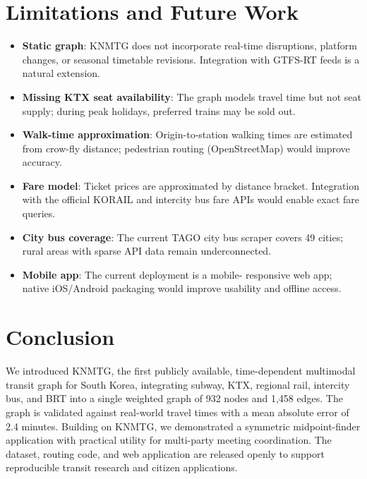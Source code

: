 \documentclass[12pt]{article}
\begin{document}
\section{Limitations and Future Work}

\begin{itemize}
  \item \textbf{Static graph}: KNMTG does not incorporate real-time
    disruptions, platform changes, or seasonal timetable revisions.
    Integration with GTFS-RT feeds is a natural extension.
  \item \textbf{Missing KTX seat availability}: The graph models travel
    time but not seat supply; during peak holidays, preferred trains
    may be sold out.
  \item \textbf{Walk-time approximation}: Origin-to-station walking
    times are estimated from crow-fly distance; pedestrian routing
    (OpenStreetMap) would improve accuracy.
  \item \textbf{Fare model}: Ticket prices are approximated by distance
    bracket. Integration with the official KORAIL and intercity bus
    fare APIs would enable exact fare queries.
  \item \textbf{City bus coverage}: The current TAGO city bus scraper
    covers 49 cities; rural areas with sparse API data remain
    underconnected.
  \item \textbf{Mobile app}: The current deployment is a mobile-
    responsive web app; native iOS/Android packaging would improve
    usability and offline access.
\end{itemize}

\section{Conclusion}

We introduced KNMTG, the first publicly available, time-dependent
multimodal transit graph for South Korea, integrating subway, KTX,
regional rail, intercity bus, and BRT into a single weighted graph of
932 nodes and 1,458 edges. The graph is validated against real-world
travel times with a mean absolute error of 2.4 minutes. Building on
KNMTG, we demonstrated a symmetric midpoint-finder application with
practical utility for multi-party meeting coordination. The dataset,
routing code, and web application are released openly to support
reproducible transit research and citizen applications.
\end{document}
